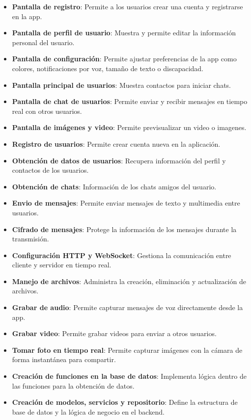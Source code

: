 \documentclass[lettersize,journal]{IEEEtran}
\begin{document}
\begin{itemize}
	\item \textbf{Pantalla de registro}: Permite a los usuarios crear una cuenta y registrarse en la app.
	\item \textbf{Pantalla de perfil de usuario}: Muestra y permite editar la información personal del usuario.
	\item \textbf{Pantalla de configuración}: Permite ajustar preferencias de la app como colores, notificaciones por voz, tamaño de texto o discapacidad.
	\item \textbf{Pantalla principal de usuarios}: Muestra contactos para iniciar chats.
	\item \textbf{Pantalla de chat de usuarios}: Permite enviar y recibir mensajes en tiempo real con otros usuarios.
	\item \textbf{Pantalla de imágenes y video}: Permite previsualizar un video o imagenes.
	\item \textbf{Registro de usuarios}: Permite crear cuenta nueva en la aplicación.
	\item \textbf{Obtención de datos de usuarios}: Recupera información del perfil y contactos de los usuarios.
	\item \textbf{Obtención de chats}: Información de los chats amigos del usuario.
	\item \textbf{Envio de mensajes}: Permite enviar mensajes de texto y multimedia entre usuarios.
	\item \textbf{Cifrado de mensajes}: Protege la información de los mensajes durante la transmisión.
	\item \textbf{Configuración HTTP y WebSocket}: Gestiona la comunicación entre cliente y servidor en tiempo real.
	\item \textbf{Manejo de archivos}: Administra la creación, eliminación y actualización de archivos.
	\item \textbf{Grabar de audio}: Permite capturar mensajes de voz directamente desde la app.
	\item \textbf{Grabar video}: Permite grabar videos para enviar a otros usuarios.
	\item \textbf{Tomar foto en tiempo real}: Permite capturar imágenes con la cámara de forma instantánea para compartir.
	\item \textbf{Creación de funciones en la base de datos}: Implementa lógica dentro de las funciones para la obtención de datos.
	\item \textbf{Creación de modelos, servicios y repositorio}: Define la estructura de base de datos y la lógica de negocio en el backend.

\end{itemize}
\end{document}
